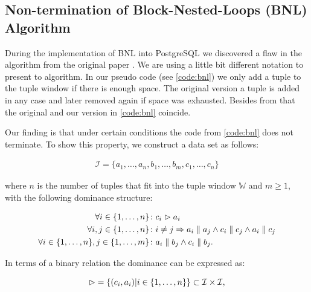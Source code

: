 \subsection{Non-termination of Block-Nested-Loops (BNL) Algorithm}
During the implementation of BNL into PostgreSQL we discovered a flaw in
the algorithm from the original paper \citep{Borzsonyi2001}.  
We are using a little bit different notation to present to algorithm.
In our pseudo code (see \autoref{code:bnl}) we only add a tuple to the
tuple window if there is enough space.  
%
The original version a tuple is added in any case and later removed
again if space was exhausted.  
%
Besides from that the original and our version in \autoref{code:bnl}
coincide.

Our finding is that under certain conditions the code from
\autoref{code:bnl} does not terminate.  To show this property, we
construct a data set as follows:

\begin{eqnarray}
\mathcal{I} = \{a_1, \ldots, a_n, b_1, \ldots, b_m, c_1, \ldots, c_n\}
\end{eqnarray}

\noindent
where $n$ is the number of tuples that fit into the tuple window
$\mathbb{W}$ and $m \ge 1$, with the following dominance structure:

\begin{align}
\forall i \in \{1, \ldots, n\}\colon & c_i \vartriangleright a_i \label{eqn:bnlntds1} \\
\forall i, j \in \{1, \ldots, n\}\colon & i \neq j \Rightarrow a_i \parallel a_j \land c_i \parallel c_j \land a_i \parallel c_j \label{eqn:bnlntds2} \\
\forall i \in \{1, \ldots, n\}, j \in \{1, \ldots, m\}\colon & a_i \parallel b_j \land c_i \parallel b_j. \label{eqn:bnlntds3} 
\end{align}

\noindent
In terms of a binary relation the dominance can be expressed as:

\begin{equation}
\vartriangleright\; = \{(c_i, a_i) | i \in \{1, \ldots, n\}\} \subset \mathcal{I} \times \mathcal{I},
\end{equation}


